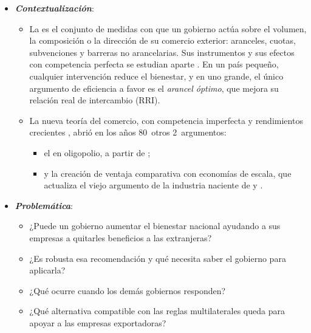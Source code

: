 \documentclass[11pt]{article}
\begin{document}
\begin{itemize}
\item \textbf{\emph{Contextualización}}:
  \begin{itemize}
  \item La  es el conjunto de medidas con que un gobierno actúa sobre el volumen, la composición o la dirección de su comercio exterior: aranceles, cuotas, subvenciones y barreras no arancelarias. Sus instrumentos y sus efectos con competencia perfecta se estudian aparte . En un país pequeño, cualquier intervención reduce el bienestar, y en uno grande, el único argumento de eficiencia a favor es el \emph{arancel óptimo}, que mejora su relación real de intercambio (RRI).
  \item La nueva teoría del comercio, con competencia imperfecta y rendimientos crecientes , abrió en los años 80~otros 2~argumentos:
    \begin{itemize}
    \item el  en oligopolio, a partir de \textcite{BranderSpencer1985Export};
    \item y la creación de ventaja comparativa con economías de escala, que actualiza el viejo argumento de la industria naciente de \textcite{Hamilton1791Report} y \textcite{List1841System}.
    \end{itemize}
  \end{itemize}

\item \textbf{\emph{Problemática}}:
  \begin{itemize}
  \item ¿Puede un gobierno aumentar el bienestar nacional ayudando a sus empresas a quitarles beneficios a las extranjeras?
  \item ¿Es robusta esa recomendación y qué necesita saber el gobierno para aplicarla?
  \item ¿Qué ocurre cuando los demás gobiernos responden?
  \item ¿Qué alternativa compatible con las reglas multilaterales queda para apoyar a las empresas exportadoras?
  \end{itemize}


\end{itemize}
\end{document}

